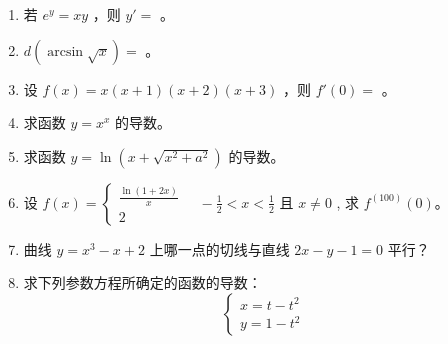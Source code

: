 \documentclass[12pt, a4paper]{article}
\begin{document}
\begin{enumerate}
    \item 若 $ e^{y} = xy $ ，则 $ y'= $ \underline{\hspace{2cm}}。

    \item $ d(\arcsin\sqrt{x}) = $ \underline{\hspace{2cm}}。

    \item 设 $ f(x) = x(x + 1)(x + 2)(x + 3) $ ，则 $ f'(0) = $ \underline{\hspace{2cm}}。

    \item 求函数 $ y = x^{x} $ 的导数。

    \item 求函数 $ y = \ln(x + \sqrt{x^{2} + a^{2}}) $ 的导数。

    \item 设 $ f(x)=\begin{cases}\frac{\ln(1+2x)}{x}\\2\end{cases} \quad -\frac{1}{2}<x<\frac{1}{2} $ 且 $ x\neq0 $ , 求 $ f^{(100)}(0) $。

    \item 曲线 $ y = x^{3} - x + 2 $ 上哪一点的切线与直线 $ 2x - y - 1 = 0 $ 平行？

    \item 求下列参数方程所确定的函数的导数：
    $$ \begin{cases}x=t-t^{2}\\ y=1-t^{2}\end{cases} $$
\end{enumerate}
\end{document}
